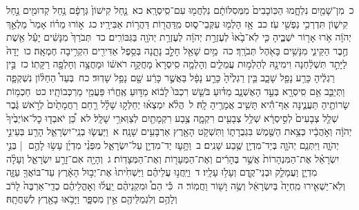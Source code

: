 \documentclass[18pt]{article}
\newcommand{\kri}[1]{\Afootnote{#1}}	%
\begin{document}
 {\loc כ~}מִן־שָׁמַ֖יִם נִלְחָ֑מוּ      הַכּֽוֹכָבִים֙ מִמְּסִלּוֹתָ֔ם נִלְחֲמ֖וּ עִם־סִֽיסְרָֽא׃ \startlock
 {\loc כא~}נַ֤חַל קִישׁוֹן֙ גְּרָפָ֔ם      נַ֥חַל קְדוּמִ֖ים נַ֣חַל קִישׁ֑וֹן      תִּדְרְכִ֥י נַפְשִׁ֖י עֹֽז׃ \startlock
 {\loc כב~}אָ֥ז הָלְמ֖וּ עִקְּבֵי־ס֑וּס      מִֽדַּהֲר֖וֹת דַּהֲר֥וֹת אַבִּירָֽיו׃ \startlock
 {\loc כג~}א֣וֹרוּ מֵר֗וֹז אָמַר֙ מַלְאַ֣ךְ יְהֹוָ֔ה אֹ֥רוּ אָר֖וֹר יֹשְׁבֶ֑יהָ      כִּ֤י לֹֽא־בָ֙אוּ֙ לְעֶזְרַ֣ת יְהֹוָ֔ה      לְעֶזְרַ֥ת יְהֹוָ֖ה בַּגִּבּוֹרִֽים׃ \startlock
 {\loc כד~}תְּבֹרַךְ֙ מִנָּשִׁ֔ים יָעֵ֕ל אֵ֖שֶׁת חֶ֣בֶר הַקֵּינִ֑י      מִנָּשִׁ֥ים בָּאֹ֖הֶל תְּבֹרָֽךְ׃ \startlock
 {\loc כה~}מַ֥יִם שָׁאַ֖ל חָלָ֣ב נָתָ֑נָה      בְּסֵ֥פֶל אַדִּירִ֖ים הִקְרִ֥יבָה חֶמְאָֽה׃ \startlock
 {\loc כו~}יָדָהּ֙ לַיָּתֵ֣ד תִּשְׁלַ֔חְנָה      וִימִינָ֖הּ לְהַלְמ֣וּת עֲמֵלִ֑ים      וְהָלְמָ֤ה סִֽיסְרָא֙ מָחֲקָ֣ה רֹאשׁ֔וֹ      וּמָחֲצָ֥ה וְחָלְפָ֖ה רַקָּתֽוֹ׃ \startlock
 {\loc כז~}בֵּ֣ין רַגְלֶ֔יהָ כָּרַ֥ע נָפַ֖ל שָׁכָ֑ב      בֵּ֤ין רַגְלֶ֙יהָ֙ כָּרַ֣ע נָפָ֔ל      בַּאֲשֶׁ֣ר כָּרַ֔ע שָׁ֖ם נָפַ֥ל שָׁדֽוּד׃ \startlock
 {\loc כח~}בְּעַד֩ הַחַלּ֨וֹן נִשְׁקְפָ֧ה וַתְּיַבֵּ֛ב אֵ֥ם סִֽיסְרָ֖א בְּעַ֣ד הָאֶשְׁנָ֑ב      מַדּ֗וּעַ בֹּשֵׁ֤שׁ רִכְבּוֹ֙ לָב֔וֹא      מַדּ֣וּעַ אֶֽחֱר֔וּ פַּעֲמֵ֖י מַרְכְּבוֹתָֽיו׃ \startlock
 {\loc כט~}חַכְמ֥וֹת שָׂרוֹתֶ֖יהָ תַּעֲנֶ֑ינָּה      אַף־הִ֕יא תָּשִׁ֥יב אֲמָרֶ֖יהָ לָֽהּ׃ \startlock
 {\loc ל~}הֲלֹ֨א יִמְצְא֜וּ יְחַלְּק֣וּ שָׁלָ֗ל      רַ֤חַם רַחֲמָתַ֙יִם֙ לְרֹ֣אשׁ גֶּ֔בֶר      שְׁלַ֤ל צְבָעִים֙ לְסִ֣יסְרָ֔א      שְׁלַ֥ל צְבָעִ֖ים רִקְמָ֑ה      צֶ֥בַע רִקְמָתַ֖יִם לְצַוְּארֵ֥י שָׁלָֽל׃ \startlock
 {\loc לא~}כֵּ֠ן יֹאבְד֤וּ כׇל־אוֹיְבֶ֙יךָ֙ יְהֹוָ֔ה וְאֹ֣הֲבָ֔יו כְּצֵ֥את הַשֶּׁ֖מֶשׁ בִּגְבֻרָת֑וֹ      וַתִּשְׁקֹ֥ט הָאָ֖רֶץ אַרְבָּעִ֥ים שָׁנָֽה׃ 
\startlock
 {\loc א~}וַיַּעֲשׂ֧וּ בְנֵֽי־יִשְׂרָאֵ֛ל הָרַ֖ע בְּעֵינֵ֣י יְהֹוָ֑ה וַיִּתְּנֵ֧ם יְהֹוָ֛ה בְּיַד־מִדְיָ֖ן שֶׁ֥בַע שָׁנִֽים׃ \startlock
 {\loc ב~}וַתָּ֥עׇז יַד־מִדְיָ֖ן עַל־יִשְׂרָאֵ֑ל מִפְּנֵ֨י מִדְיָ֜ן עָשׂ֥וּ לָהֶ֣ם  |  בְּנֵ֣י יִשְׂרָאֵ֗ל אֶת־הַמִּנְהָרוֹת֙ אֲשֶׁ֣ר בֶּהָרִ֔ים וְאֶת־הַמְּעָר֖וֹת וְאֶת־הַמְּצָדֽוֹת׃ \startlock
 {\loc ג~}וְהָיָ֖ה אִם־זָרַ֣ע יִשְׂרָאֵ֑ל וְעָלָ֨ה מִדְיָ֧ן וַעֲמָלֵ֛ק וּבְנֵי־קֶ֖דֶם וְעָל֥וּ עָלָֽיו׃ \startlock
 {\loc ד~}וַיַּֽחֲנ֣וּ עֲלֵיהֶ֗ם וַיַּשְׁחִ֙יתוּ֙ אֶת־יְב֣וּל הָאָ֔רֶץ עַד־בּוֹאֲךָ֖ עַזָּ֑ה וְלֹֽא־יַשְׁאִ֤ירוּ מִֽחְיָה֙ בְּיִשְׂרָאֵ֔ל וְשֶׂ֥ה וָשׁ֖וֹר וַחֲמֽוֹר׃ \startlock
 {\loc ה~}כִּ֡י הֵם֩ וּמִקְנֵיהֶ֨ם יַֽעֲל֜וּ  וְאׇהֳלֵיהֶ֗ם   \edtext{(יבאו)}{\kri{קרי: וּבָ֤אוּ}}  כְדֵֽי־אַרְבֶּה֙ לָרֹ֔ב וְלָהֶ֥ם וְלִגְמַלֵּיהֶ֖ם אֵ֣ין מִסְפָּ֑ר וַיָּבֹ֥אוּ בָאָ֖רֶץ לְשַׁחֲתָֽהּ׃ \startlock
\end{document}
